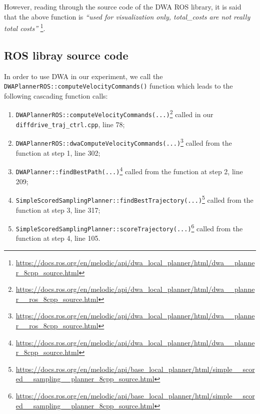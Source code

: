 \documentclass[11pt,a4paper]{article}
\begin{document}
However, reading through the source code of the DWA ROS library, it is said that the above function is
\textit{``used for visualization only, total\_costs are not really total costs''} \footnote{\href{https://docs.ros.org/en/melodic/api/dwa\_local\_planner/html/dwa\_\_planner\_8cpp\_source.html}{https://docs.ros.org/en/melodic/api/dwa\_local\_planner/html/dwa\_\_planner\_8cpp\_source.html}}.



\subsection{ROS libray source code}

In order to use DWA in our experiment, we call the \texttt{DWAPlannerROS::computeVelocityCommands()} function which leads to the following cascading function calls:\\
\begin{enumerate}

 \item \texttt{DWAPlannerROS::computeVelocityCommands(...)}\footnote{\href{https://docs.ros.org/en/melodic/api/dwa\_local\_planner/html/dwa\_\_planner\_\_ros\_8cpp\_source.html}{https://docs.ros.org/en/melodic/api/dwa\_local\_planner/html/dwa\_\_planner\_\_ros\_8cpp\_source.html}}
 called in our \texttt{diffdrive\_traj\_ctrl.cpp}, line 78;

 \item \texttt{DWAPlannerROS::dwaComputeVelocityCommands(...)}\footnote{\href{https://docs.ros.org/en/melodic/api/dwa\_local\_planner/html/dwa\_\_planner\_\_ros\_8cpp\_source.html}{https://docs.ros.org/en/melodic/api/dwa\_local\_planner/html/dwa\_\_planner\_\_ros\_8cpp\_source.html}}
 called from the function at step 1, line 302;

 \item \texttt{DWAPlanner::findBestPath(...)}\footnote{\href{https://docs.ros.org/en/melodic/api/dwa\_local\_planner/html/dwa\_\_planner\_8cpp\_source.html}{https://docs.ros.org/en/melodic/api/dwa\_local\_planner/html/dwa\_\_planner\_8cpp\_source.html}}
 called from the function at step 2, line 209;

 \item \texttt{SimpleScoredSamplingPlanner::findBestTrajectory(...)}\footnote{\href{https://docs.ros.org/en/melodic/api/base\_local\_planner/html/simple\_\_scored\_\_sampling\_\_planner\_8cpp\_source.html}{https://docs.ros.org/en/melodic/api/base\_local\_planner/html/simple\_\_scored\_\_sampling\_\_planner\_8cpp\_source.html}}
 called from the function at step 3, line 317;

 \item \texttt{SimpleScoredSamplingPlanner::scoreTrajectory(...)}\footnote{\href{https://docs.ros.org/en/melodic/api/base\_local\_planner/html/simple\_\_scored\_\_sampling\_\_planner\_8cpp\_source.html}{https://docs.ros.org/en/melodic/api/base\_local\_planner/html/simple\_\_scored\_\_sampling\_\_planner\_8cpp\_source.html}}
 called from the function at step 4, line 105.\\

\end{enumerate}
\end{document}
